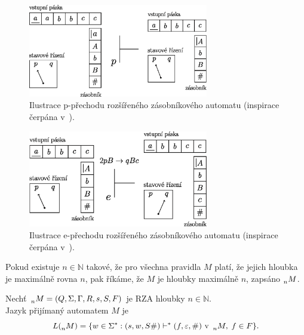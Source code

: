 \begin{figure}[ht]
    \centering
    \includegraphics[width=0.7\textwidth]{obrazky-figures/rza_pop.eps}
    \caption{Ilustrace p-přechodu rozšířeného zásobníkového automatu (inspirace čerpána v~\cite{meduna_rgd_pda}).}
    \label{fig_p-prechod_rza}
\end{figure}

\begin{figure}[ht]
    \centering
    \includegraphics[width=0.7\textwidth]{obrazky-figures/rza_expanze.eps}
    \caption{Ilustrace e-přechodu rozšířeného zásobníkového automatu (inspirace čerpána v~\cite{meduna_rgd_pda}).}
    \label{fig_e-prechod_rza}
\end{figure}

Pokud existuje $n \in \mathbb{N}$ takové, že pro všechna pravidla $M$ platí, že jejich hloubka je maximálně rovna $n$, pak říkáme, že $M$ je hloubky maximálně $n$, zapsáno $\prescript{}{n}{M}$.

\begin{definition}\label{def_jazyk_rza}
    Nechť $\prescript{}{n}{M} = (Q, \Sigma, \Gamma, R, s, S, F)$ je RZA hloubky $n \in \mathbb{N}$. \\
    Jazyk přijímaný automatem $M$ je
    \begin{equation*}
        L(\prescript{}{n}{M}) = \{w \in \Sigma^*: (s, w, S\#) \vdash^* (f, \varepsilon, \#) \text{ v } \prescript{}{n}{M},\; f \in F\}.
    \end{equation*}
\end{definition}

